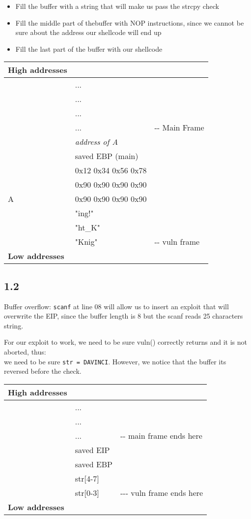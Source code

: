 \documentclass[
]{article}
\providecommand{\tightlist}{%
  \setlength{\itemsep}{0pt}\setlength{\parskip}{0pt}}
\begin{document}
\begin{itemize}
\tightlist
\item
  Fill the buffer with a string that will make us pass the strcpy check
\item
  Fill the middle part of thebuffer with NOP instructions, since we
  cannot be sure about the address our shellcode will end up
\item
  Fill the last part of the buffer with our shellcode
\end{itemize}

\begin{longtable}[]{@{}lll@{}}
\toprule\noalign{}
High addresses & & \\
\midrule\noalign{}
\endhead
\bottomrule\noalign{}
\endlastfoot
& ... & \\
& ... & \\
& ... & \\
& ... & -\/- Main Frame \\
& \emph{address of A} & \\
& saved EBP (main) & \\
& 0x12 0x34 0x56 0x78 & \\
& 0x90 0x90 0x90 0x90 & \\
A & 0x90 0x90 0x90 0x90 & \\
& "ing!" & \\
& "ht\_K" & \\
& "Knig" & -\/- vuln frame \\
\textbf{Low addresses} & & \\
\end{longtable}

\subsection{1.2}\label{section-1}

Buffer overflow: \texttt{scanf} at line 08 will allow us to insert an
exploit that will overwrite the EIP, since the buffer length is 8 but
the scanf reads 25 characters\textquotesingle{} string.

For our exploit to work, we need to be sure vuln() correctly returns and
it is not aborted, thus:\\
we need to be sure \texttt{str\ =\ DAVINCI}. However, we notice that the
buffer its reversed before the check.

\begin{longtable}[]{@{}lll@{}}
\toprule\noalign{}
High addresses & & \\
\midrule\noalign{}
\endhead
\bottomrule\noalign{}
\endlastfoot
& ... & \\
& ... & \\
& ... & -\/- main frame ends here \\
& saved EIP & \\
& saved EBP & \\
& str{[}4-7{]} & \\
& str{[}0-3{]} & -\/-\/- vuln frame ends here \\
\textbf{Low addresses} & & \\
\end{longtable}
\end{document}
